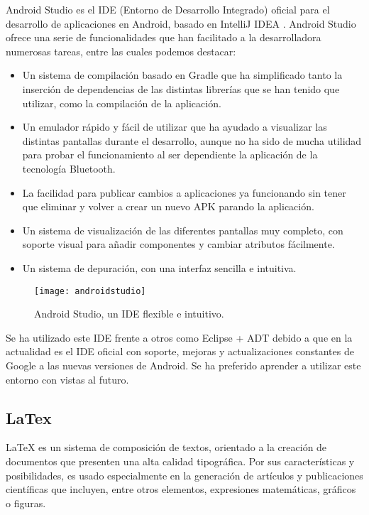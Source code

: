 Android Studio \cite{URL::AndroidStudio} es el IDE \cite{URL::IDE} (Entorno de Desarrollo Integrado) oficial para el desarrollo de aplicaciones en Android, basado en IntelliJ IDEA \cite{URL::IntelliJIDEA}. Android Studio ofrece una serie de funcionalidades que han facilitado a la desarrolladora numerosas tareas, entre las cuales podemos destacar:

\begin{itemize}
\item Un sistema de compilación basado en Gradle \cite{URL::Gradle} que ha simplificado tanto la inserción de dependencias de las distintas librerías que se han tenido que utilizar, como la compilación de la aplicación.
\item Un emulador rápido y fácil de utilizar que ha ayudado a visualizar las distintas pantallas durante el desarrollo, aunque no ha sido de mucha utilidad para probar el funcionamiento al ser dependiente la aplicación de la tecnología Bluetooth.
\item La facilidad para publicar cambios a aplicaciones ya funcionando sin tener que eliminar y volver a crear un nuevo APK parando la aplicación.
\item Un sistema de visualización de las diferentes pantallas muy completo, con soporte visual para añadir componentes y cambiar atributos fácilmente.
\item Un sistema de depuración, con una interfaz sencilla e intuitiva.
\end{itemize} 

\begin{figure}[h]
    \centering
    \texttt{[image: androidstudio]}
    \caption{Android Studio, un IDE flexible e intuitivo.}
    \label{fig:androidstudio}
\end{figure}

Se ha utilizado este IDE frente a otros como Eclipse + ADT  \cite{URL::eclipseADT} debido a que en la actualidad es el IDE oficial con soporte, mejoras y actualizaciones constantes de Google a las nuevas versiones de Android. Se ha preferido aprender a utilizar este entorno con vistas al futuro.

\subsection{LaTex}

LaTeX es un sistema de composición de textos, orientado a la creación de documentos que presenten una alta calidad tipográfica. Por sus características y posibilidades, es usado especialmente en la generación de artículos y publicaciones científicas que incluyen, entre otros elementos, expresiones matemáticas, gráficos o figuras.

